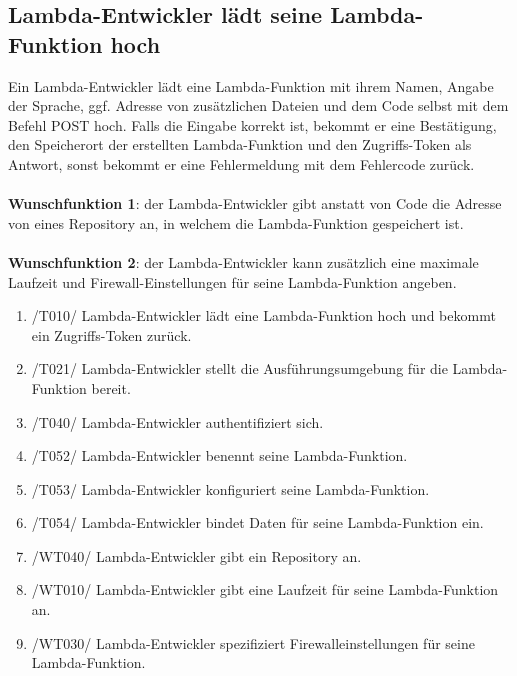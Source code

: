 \documentclass[a4paper,20pt,oneside]{book}
\begin{document}
\subsection{\gls{Lambda-Entwickler} lädt seine \gls{Lambda-Funktion} hoch}
Ein \Gls{Lambda-Entwickler} lädt eine \gls{Lambda-Funktion} mit ihrem Namen, Angabe der Sprache, ggf. Adresse von zusätzlichen Dateien und dem Code selbst mit dem Befehl POST hoch. Falls die Eingabe korrekt ist, bekommt er eine Bestätigung, den Speicherort der erstellten \gls{Lambda-Funktion} und den Zugriffs-\gls{Token} als Antwort, sonst bekommt er eine Fehlermeldung mit dem Fehlercode zurück.\\\\
\textbf{Wunschfunktion 1}: der \Gls{Lambda-Entwickler} gibt anstatt von Code die Adresse von eines \Gls{Repository} an, in welchem die \gls{Lambda-Funktion} gespeichert ist.\\\\
\textbf{Wunschfunktion 2}: der \Gls{Lambda-Entwickler} kann zusätzlich eine maximale Laufzeit und Firewall-Einstellungen für seine \gls{Lambda-Funktion} angeben.\\

\begin{enumerate}
\item /T010/ \Gls{Lambda-Entwickler} lädt eine \gls{Lambda-Funktion} hoch und bekommt ein Zugriffs-\gls{Token} zurück.
\item /T021/ \Gls{Lambda-Entwickler} stellt die Ausführungsumgebung für die \gls{Lambda-Funktion} bereit.
\item /T040/ \Gls{Lambda-Entwickler} authentifiziert sich.
\item /T052/ \Gls{Lambda-Entwickler} benennt seine \gls{Lambda-Funktion}. 
\item /T053/ \Gls{Lambda-Entwickler} konfiguriert seine \gls{Lambda-Funktion}. 
\item /T054/ \Gls{Lambda-Entwickler} bindet Daten für seine \gls{Lambda-Funktion} ein.
\item /WT040/ \Gls{Lambda-Entwickler} gibt ein \Gls{Repository} an.
\item /WT010/ \Gls{Lambda-Entwickler} gibt eine Laufzeit für seine \gls{Lambda-Funktion} an.
\item /WT030/ \Gls{Lambda-Entwickler} spezifiziert Firewalleinstellungen für seine \gls{Lambda-Funktion}.
\\
\end{enumerate} 
\end{document}
